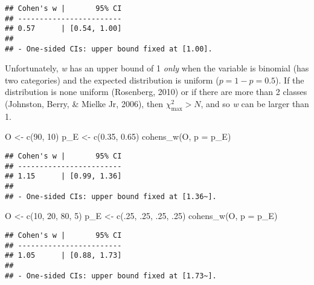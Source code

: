 \documentclass[
]{article}
\newenvironment{Shaded}{\begin{snugshade}}{\end{snugshade}}
\newcommand{\AttributeTok}[1]{\textcolor[rgb]{0.77,0.63,0.00}{#1}}
\newcommand{\DecValTok}[1]{\textcolor[rgb]{0.00,0.00,0.81}{#1}}
\newcommand{\FloatTok}[1]{\textcolor[rgb]{0.00,0.00,0.81}{#1}}
\newcommand{\FunctionTok}[1]{\textcolor[rgb]{0.00,0.00,0.00}{#1}}
\newcommand{\NormalTok}[1]{#1}
\newcommand{\OtherTok}[1]{\textcolor[rgb]{0.56,0.35,0.01}{#1}}
\begin{document}
\begin{verbatim}
## Cohen's w |       95% CI
## ------------------------
## 0.57      | [0.54, 1.00]
## 
## - One-sided CIs: upper bound fixed at [1.00].
\end{verbatim}

Unfortunately, \emph{w} has an upper bound of 1 \emph{only} when the
variable is binomial (has two categories) and the expected distribution
is uniform (\(p = 1 - p = 0.5\)). If the distribution is none uniform
(Rosenberg, 2010) or if there are more than 2 classes (Johnston, Berry,
\& Mielke Jr, 2006), then \(\chi^2_\text{max} > N\), and so \emph{w} can
be larger than 1.

\begin{Shaded}
\begin{Highlighting}[]
\NormalTok{O }\OtherTok{\textless{}{-}} \FunctionTok{c}\NormalTok{(}\DecValTok{90}\NormalTok{, }\DecValTok{10}\NormalTok{)}
\NormalTok{p\_E }\OtherTok{\textless{}{-}} \FunctionTok{c}\NormalTok{(}\FloatTok{0.35}\NormalTok{, }\FloatTok{0.65}\NormalTok{)}
\FunctionTok{cohens\_w}\NormalTok{(O, }\AttributeTok{p =}\NormalTok{ p\_E)}
\end{Highlighting}
\end{Shaded}

\begin{verbatim}
## Cohen's w |       95% CI
## ------------------------
## 1.15      | [0.99, 1.36]
## 
## - One-sided CIs: upper bound fixed at [1.36~].
\end{verbatim}

\begin{Shaded}
\begin{Highlighting}[]
\NormalTok{O }\OtherTok{\textless{}{-}} \FunctionTok{c}\NormalTok{(}\DecValTok{10}\NormalTok{, }\DecValTok{20}\NormalTok{, }\DecValTok{80}\NormalTok{, }\DecValTok{5}\NormalTok{)}
\NormalTok{p\_E }\OtherTok{\textless{}{-}} \FunctionTok{c}\NormalTok{(.}\DecValTok{25}\NormalTok{, .}\DecValTok{25}\NormalTok{, .}\DecValTok{25}\NormalTok{, .}\DecValTok{25}\NormalTok{)}
\FunctionTok{cohens\_w}\NormalTok{(O, }\AttributeTok{p =}\NormalTok{ p\_E)}
\end{Highlighting}
\end{Shaded}

\begin{verbatim}
## Cohen's w |       95% CI
## ------------------------
## 1.05      | [0.88, 1.73]
## 
## - One-sided CIs: upper bound fixed at [1.73~].
\end{verbatim}
\end{document}
